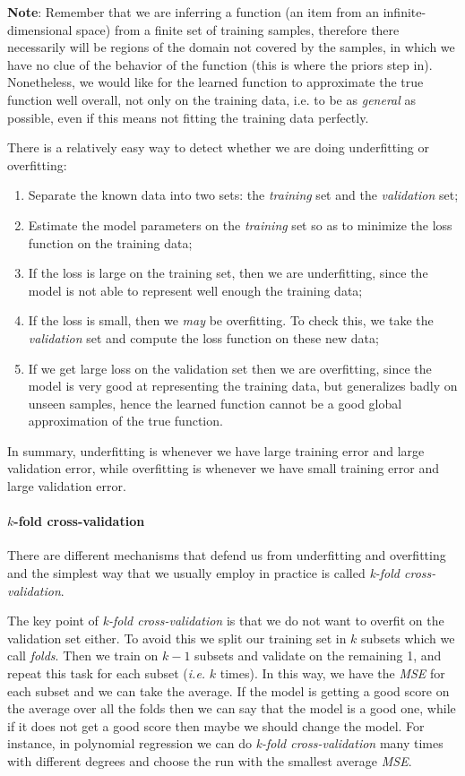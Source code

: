 \begin{tcolorbox}
    \textbf{Note}: Remember that we are inferring a function (an item from an infinite-dimensional space) from a finite set of training samples, therefore there necessarily will be regions of the domain not covered by the samples, in which we have no clue of the behavior of the function (this is where the priors step in). Nonetheless, we would like for the learned function to approximate the true function well overall, not only on the training data, i.e. to be as \emph{general} as possible, even if this means not fitting the training data perfectly. 
\end{tcolorbox}

There is a relatively easy way to detect whether we are doing underfitting or overfitting:
\begin{enumerate}
    \item Separate the known data into two sets: the \emph{training} set and the \emph{validation} set;
	\item Estimate the model parameters on the \emph{training} set so as to minimize the loss function on the training data;
	\item If the loss is large on the training set, then we are underfitting, since the model is not able to represent well enough the training data;
	\item If the loss is small, then we \emph{may} be overfitting. To check this, we take the \emph{validation} set and compute the loss function on these new data;
	\item If we get large loss on the validation set then we are overfitting, since the model is very good at representing the training data, but generalizes badly on unseen samples, hence the learned function cannot be a good global approximation of the true function.
\end{enumerate}
In summary, underfitting is whenever we have large training error and large validation error, while overfitting is whenever we have small training error and large validation error.

\paragraph{$k$-fold cross-validation}
There are different mechanisms that defend us from underfitting and overfitting and the simplest way that we usually employ in practice is called \emph{k-fold cross-validation}.

The key point of \emph{k-fold cross-validation} is that we do not want to overfit on the validation set either. To avoid this we split our training set in $k$ subsets which we call \emph{folds}. Then we train on $k-1$ subsets and validate on the remaining 1, and repeat this task for each subset (\textit{i.e.} $k$ times). In this way, we have the \emph{MSE} for each subset and we can take the average. If the model is getting a good score on the average over all the folds then we can say that the model is a good one, while if it does not get a good score then maybe we should change the model.
For instance, in polynomial regression we can do \emph{k-fold cross-validation} many times with different degrees and choose the run with the smallest average \emph{MSE}.

